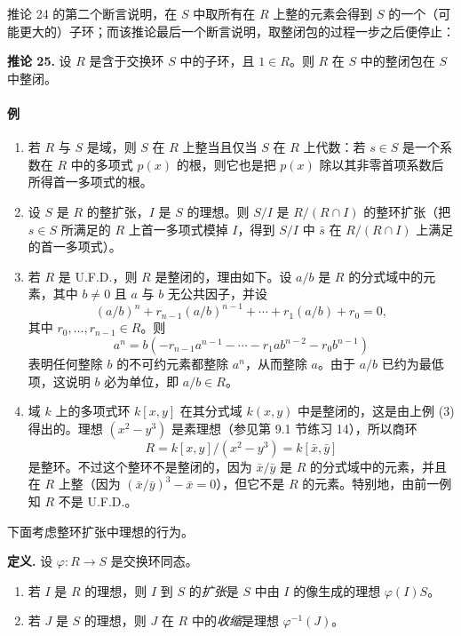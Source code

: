 推论 24 的第二个断言说明，在 $S$ 中取所有在 $R$ 上整的元素会得到 $S$ 的一个（可能更大的）子环；而该推论最后一个断言说明，取整闭包的过程一步之后便停止：

\noindent\textbf{推论 25.} 设 $R$ 是含于交换环 $S$ 中的子环，且 $1\in R$。则 $R$ 在 $S$ 中的整闭包在 $S$ 中整闭。

\paragraph{例}
\begin{enumerate}[label=(\arabic*)]
	\item 若 $R$ 与 $S$ 是域，则 $S$ 在 $R$ 上整当且仅当 $S$ 在 $R$ 上代数：若 $s\in S$ 是一个系数在 $R$ 中的多项式 $p(x)$ 的根，则它也是把 $p(x)$ 除以其非零首项系数后所得首一多项式的根。
	\item 设 $S$ 是 $R$ 的整扩张，$I$ 是 $S$ 的理想。则 $S/I$ 是 $R/(R\cap I)$ 的整环扩张（把 $s\in S$ 所满足的 $R$ 上首一多项式模掉 $I$，得到 $S/I$ 中 $\bar s$ 在 $R/(R\cap I)$ 上满足的首一多项式）。
	\item 若 $R$ 是 U.F.D.，则 $R$ 是整闭的，理由如下。设 $a/b$ 是 $R$ 的分式域中的元素，其中 $b\ne0$ 且 $a$ 与 $b$ 无公共因子，并设
	\[
	(a/b)^n+r_{n-1}(a/b)^{n-1}+\cdots+r_1(a/b)+r_0=0,
	\]
	其中 $r_0,\ldots,r_{n-1}\in R$。则
	\[
	a^n=b(-r_{n-1}a^{n-1}-\cdots-r_1ab^{n-2}-r_0b^{n-1})
	\]
	表明任何整除 $b$ 的不可约元素都整除 $a^n$，从而整除 $a$。由于 $a/b$ 已约为最低项，这说明 $b$ 必为单位，即 $a/b\in R$。
	\item 域 $k$ 上的多项式环 $k[x,y]$ 在其分式域 $k(x,y)$ 中是整闭的，这是由上例 (3) 得出的。理想 $(x^2-y^3)$ 是素理想（参见第 9.1 节练习 14），所以商环
	\[
	R=k[x,y]/(x^2-y^3)=k[\bar x,\bar y]
	\]
	是整环。不过这个整环不是整闭的，因为 $\bar x/\bar y$ 是 $R$ 的分式域中的元素，并且在 $R$ 上整（因为 $(\bar x/\bar y)^3-\bar x=0$），但它不是 $R$ 的元素。特别地，由前一例知 $R$ 不是 U.F.D.。
\end{enumerate}

下面考虑整环扩张中理想的行为。

\noindent\textbf{定义.} 设 $\varphi:R\to S$ 是交换环同态。
\begin{enumerate}[label=(\alph*)]
	\item 若 $I$ 是 $R$ 的理想，则 $I$ 到 $S$ 的\emph{扩张}是 $S$ 中由 $I$ 的像生成的理想 $\varphi(I)S$。
	\item 若 $J$ 是 $S$ 的理想，则 $J$ 在 $R$ 中的\emph{收缩}是理想 $\varphi^{-1}(J)$。
\end{enumerate}


